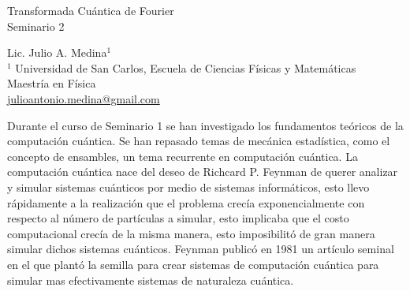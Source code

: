 \documentclass[a4paper]{article}
\begin{document}

\Large
 \begin{center}
Transformada Cuántica de Fourier\\
Seminario 2  

\hspace{10pt}

\large
Lic. Julio A. Medina$^1$ \\

\hspace{10pt}
\small  
$^1$ Universidad de San Carlos, Escuela de Ciencias Físicas y Matemáticas\\
Maestría en Física\\
\href{mailto:julioantonio.medina@gmail.com}{julioantonio.medina@gmail.com}\\

\end{center}

\hspace{10pt}

\normalsize
Durante el curso de Seminario 1 se han investigado los fundamentos teóricos de la computación cuántica. Se han repasado temas de mecánica estadística, como el concepto de ensambles, un tema recurrente en computación cuántica. La computación cuántica nace del deseo de Richcard P. Feynman de querer analizar y simular sistemas cuánticos por medio de sistemas informáticos, esto llevo rápidamente a la realización que el problema crecía exponencialmente con respecto al número de partículas a simular, esto implicaba que el costo computacional crecía de la misma manera, esto imposibilitó de gran manera simular dichos sistemas cuánticos. Feynman\cite{Feynman} publicó en 1981 un artículo seminal en el que plantó la semilla para crear sistemas de computación cuántica para simular mas efectivamente sistemas de naturaleza cuántica. \\
\end{document}
